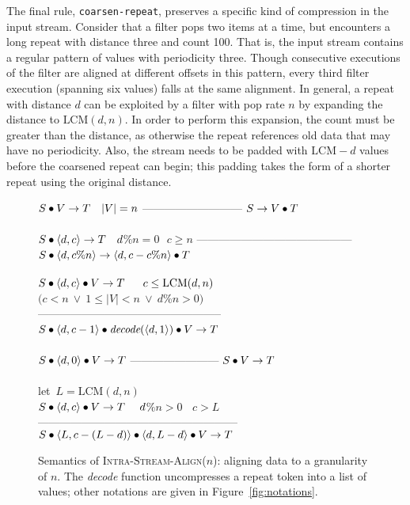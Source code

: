 The final rule, {\tt coarsen-repeat}, preserves a specific kind of
compression in the input stream.  Consider that a filter pops two
items at a time, but encounters a long repeat with distance three and
count 100.  That is, the input stream contains a regular pattern of
values with periodicity three.  Though consecutive executions of the
filter are aligned at different offsets in this pattern, every third
filter execution (spanning six values) falls at the same alignment.
In general, a repeat with distance $d$ can be exploited by a filter
with pop rate $n$ by expanding the distance to $\mbox{LCM}(d, n)$.  In
order to perform this expansion, the count must be greater than the
distance, as otherwise the repeat references old data that may have no
periodicity.  Also, the stream needs to be padded with $\mbox{LCM}-d$
values before the coarsened repeat can begin; this padding takes the
form of a shorter repeat using the original distance.

\begin{figure}[t]
$S \bullet V \rightarrow T~~~|V|=n$\skiptopb
---------------------------\skipbot
$S \rightarrow V \bullet T$
~ \\ ~ \\
$S \bullet \langle d, c\rangle \rightarrow T~~~d$\%$n=0~~~c \ge n$\skiptopb
------------------------------------------\skipbot
$S \concat \tup{d}{c$\%$n} \rightarrow \tup{d}{c-c$\%$n} \concat T$
~ \\ ~ \\
$S \bullet \langle d, c\rangle \bullet V \rightarrow T~~~~~c\le\mbox{LCM}(d,n)$\\
$(c<n~\vee~1 \le |V|<n~\vee~d$\%$n>0)$\skiptopb
--------------------------------------------------\skipbot
$S \bullet \langle d, c-1\rangle \bullet \mbox{\it decode}(\langle d, 1\rangle) \bullet V \rightarrow T$
~ \\ ~ \\
$S \bullet \langle d, 0\rangle \bullet V \rightarrow T$\skiptopb
------------------------\skipbot
$S \bullet V \rightarrow T$
~ \\ ~ \\
let~$L=\mbox{LCM}(d,n)$\\
$S \bullet \langle d, c\rangle \bullet V \rightarrow T~~~~d$\%$n > 0~~~~c > L$\vspace{-3pt}\skiptopa
------------------------------------------------------\skipbot
$S \bullet \langle L, c-(L-d)\rangle \bullet \langle d, L-d\rangle \bullet V \rightarrow T$
\caption{Semantics of \textsc{Intra-Stream-Align}($n$): aligning data
to a granularity of $n$.  The \mbox{\it decode} function uncompresses
a repeat token into a list of values; other notations are given in
Figure~\ref{fig:notations}. \protect\label{fig:intra-stream-align}}
\end{figure}

